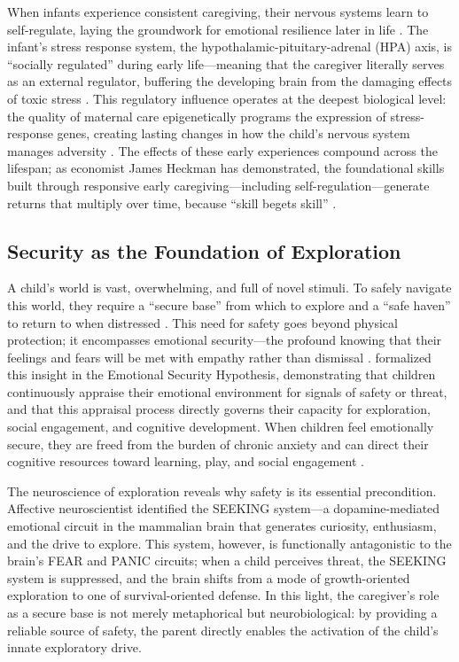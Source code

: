 When infants experience consistent caregiving, their nervous systems learn to self-regulate, laying the groundwork for emotional resilience later in life \citep{porges2011}.
The infant's stress response system, the hypothalamic-pituitary-adrenal (HPA) axis, is ``socially regulated'' during early life---meaning that the caregiver literally serves as an external regulator, buffering the developing brain from the damaging effects of toxic stress \citep{gunnar2007}.
This regulatory influence operates at the deepest biological level: the quality of maternal care epigenetically programs the expression of stress-response genes, creating lasting changes in how the child's nervous system manages adversity \citep{meaney2001}.
The effects of these early experiences compound across the lifespan; as economist James Heckman has demonstrated, the foundational skills built through responsive early caregiving---including self-regulation---generate returns that multiply over time, because ``skill begets skill'' \citep{heckman2006}.

\subsection{Security as the Foundation of Exploration}

A child's world is vast, overwhelming, and full of novel stimuli.
To safely navigate this world, they require a ``secure base'' from which to explore and a ``safe haven'' to return to when distressed \citep{ainsworth1978}.
This need for safety goes beyond physical protection; it encompasses emotional security---the profound knowing that their feelings and fears will be met with empathy rather than dismissal \citep{siegel2003}.
\citet{davies1994} formalized this insight in the Emotional Security Hypothesis, demonstrating that children continuously appraise their emotional environment for signals of safety or threat, and that this appraisal process directly governs their capacity for exploration, social engagement, and cognitive development.
When children feel emotionally secure, they are freed from the burden of chronic anxiety and can direct their cognitive resources toward learning, play, and social engagement \citep{warneken2018}.

The neuroscience of exploration reveals why safety is its essential precondition.
Affective neuroscientist \citet{panksepp1998} identified the SEEKING system---a dopamine-mediated emotional circuit in the mammalian brain that generates curiosity, enthusiasm, and the drive to explore.
This system, however, is functionally antagonistic to the brain's FEAR and PANIC circuits; when a child perceives threat, the SEEKING system is suppressed, and the brain shifts from a mode of growth-oriented exploration to one of survival-oriented defense.
In this light, the caregiver's role as a secure base is not merely metaphorical but neurobiological: by providing a reliable source of safety, the parent directly enables the activation of the child's innate exploratory drive.

